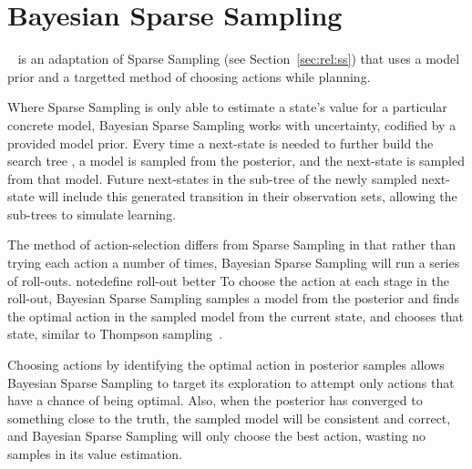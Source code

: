 


\section{Bayesian Sparse Sampling}

~\cite{wang05} is an adaptation of Sparse Sampling (see Section~\ref{sec:rel:ss}) that uses a model prior and a targetted method of choosing actions while planning.

Where Sparse Sampling  is only able to estimate a state's value for a particular concrete model, Bayesian Sparse Sampling works with uncertainty, codified by a provided model prior. Every time a next-state is needed to further build the search tree  , a model is sampled from the posterior, and the next-state is sampled from that model. Future next-states in the sub-tree of the newly sampled next-state will include this generated transition in their observation sets, allowing the sub-trees to simulate learning. 

The method of action-selection differs from Sparse Sampling in that rather than trying each action a number of times, Bayesian Sparse Sampling will run a series of roll-outs. note{define roll-out better} To choose the action at each stage in the roll-out, Bayesian Sparse Sampling samples a model from the posterior and finds the optimal action in the sampled model from the current state, and chooses that state, similar to Thompson sampling~\cite{thompson33}.


Choosing actions by identifying the optimal action in posterior samples allows Bayesian Sparse Sampling to target its exploration to attempt only actions that have a chance of being optimal. Also, when the posterior has converged to something close to the truth, the sampled model will be consistent and correct, and Bayesian Sparse Sampling will only choose the best action, wasting no samples in its value estimation.

